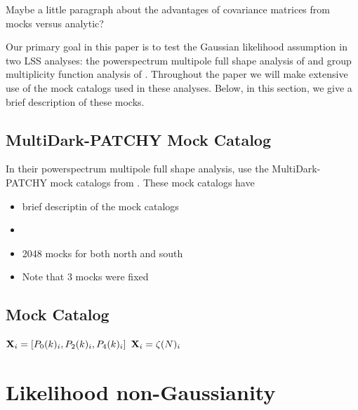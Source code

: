 \documentclass[12pt, letterpaper, preprint]{aastex}
\newcommand{\bitem}{\begin{itemize}}
\newcommand{\eitem}{\end{itemize}}
\begin{document}
Maybe a little paragraph about the advantages of covariance matrices from 
mocks versus analytic? 

Our primary goal in this paper is to test the Gaussian likelihood assumption 
in two LSS analyses: the powerspectrum multipole full shape analysis of \cite{beutler2017} 
and group multiplicity function analysis of \cite{sinha2017}. Throughout
the paper we will make extensive use of the mock catalogs used in these 
analyses. Below, in this section, we give a brief description of these mocks. 

\subsection{MultiDark-PATCHY Mock Catalog} 
In their powerspectrum multipole full shape analysis, \cite{beutler2017}
use the MultiDark-PATCHY mock catalogs from \cite{ktaura2016}. 
These mock catalogs have 


\bitem
    \item brief descriptin of the mock catalogs 
    \item \cite{kitaura2016}
    \item 2048 mocks for both north and south 
    \item Note that 3 mocks were fixed
\eitem

\subsection{\cite{sinha2017} Mock Catalog}

${\bf X}_i = [P_0(k)_i,P_2(k)_i,P_4(k)_i]$
${\bf X}_i = \zeta(N)_i$


\section{Likelihood non-Gaussianity}
\end{document}
